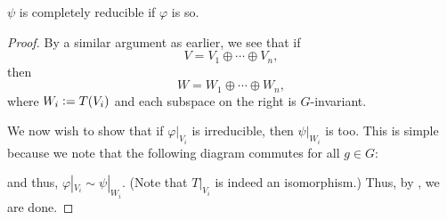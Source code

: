 \begin{prop} \label{prop:compreducibleequiv}
	$\psi$ is completely reducible if $\varphi$ is so.
\end{prop}
\begin{proof} 
	By a similar argument as earlier, we see that if
	\begin{equation*} 
		V = V_1 \oplus \cdots \oplus V_n,
	\end{equation*}
	then
	\begin{equation*} 
		W = W_1 \oplus \cdots \oplus W_n,
	\end{equation*}
	where $W_i \vcentcolon= T(V_i)$ and each subspace on the right is $G$-invariant.

	We now wish to show that if $\varphi|_{V_i}$ is irreducible, then $\psi|_{W_i}$ is too. This is simple because we note that the following diagram commutes for all $g \in G:$
	\begin{center}
	\end{center}
	and thus, $\varphi|_{V_i} \sim \psi|_{W_i}.$ (Note that $T|_{V_i}$ is indeed an isomorphism.) Thus, by , we are done.
\end{proof}


